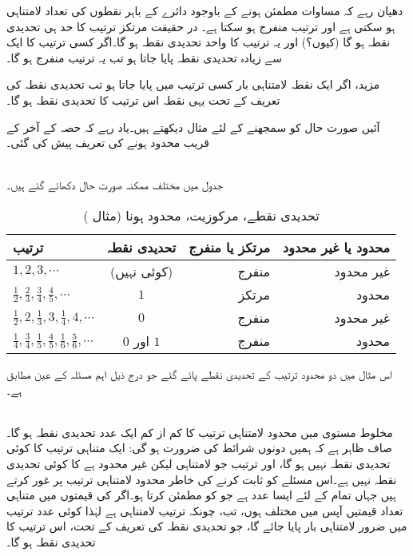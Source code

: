 دھیان رہے کہ مساوات  مطمئن ہونے کے باوجود  دائرے کے باہر نقطوں کی تعداد لامتناہی ہو سکتی ہے اور ترتیب منفرج ہو سکتا ہے۔ در حقیقت مرتکز ترتیب کا حد ہی تحدیدی نقطہ ہو گا (کیوں؟)  اور یہ ترتیب کا واحد تحدیدی نقطہ ہو گا۔اگر کسی ترتیب کا ایک سے زیادہ تحدیدی نقطہ پایا جاتا ہو تب یہ ترتیب منفرج ہو گا۔

مزید، اگر ایک نقطہ لامتناہی بار کسی ترتیب میں پایا جاتا ہو تب تحدیدی نقطہ کی تعریف کے تحت یہی نقطہ اس ترتیب کا تحدیدی نقطہ ہو گا۔

آئیں صورت حال کو سمجھنے کے لئے مثال  دیکھتے ہیں۔یاد رہے کہ حصہ  کے آخر کے قریب محدود ہونے کی تعریف پیش کی گئی۔

\quad {}\\
جدول  میں مختلف ممکنہ  صورت حال دکھائے گئے ہیں۔
\begin{table}
\caption{تحدیدی نقطے، مرکوزیت، محدود ہونا (مثال )}
\label{جدول_مثال_ترتیب_جدول_تحدیدی_نقطہ_وغیرہ}
\centering
\begin{tabular}{l | c | r | r}
\hline
ترتیب& تحدیدی نقطہ& مرتکز یا منفرج& محدود یا غیر محدود\\
\hline
\Tstrut $1,2,3,\cdots$& (کوئی نہیں)&منفرج & غیر محدود\\[0.5ex]
$\frac{1}{2}, \frac{2}{3},\frac{3}{4},\frac{4}{5},\cdots$ & $1$ & مرتکز & محدود\\[0.5ex]
$\frac{1}{2},2,\frac{1}{3},3,\frac{1}{4},4,\cdots$ & $0$ & منفرج& غیر محدود\\[0.5ex]
$\frac{1}{4}, \frac{3}{4}, \frac{1}{5},\frac{4}{5}, \frac{1}{6},\frac{5}{6},\cdots$ & $\,0$ اور $1\,$  & منفرج & محدود\\[0.5ex]
\hline
\end{tabular}
\end{table}
 اس مثال میں دو محدود ترتیب کے تحدیدی نقطے پائے گئے جو درج ذیل اہم مسئلہ کے عین مطابق ہے۔

\quad {}\\
مخلوط مستوی میں محدود لامتناہی ترتیب  کا کم از کم ایک عدد تحدیدی نقطہ ہو گا۔
\quad
صاف ظاہر ہے کہ ہمیں دونوں شرائط کی ضرورت ہو گی: ایک متناہی ترتیب کا کوئی تحدیدی نقطہ نہیں ہو گا، اور ترتیب  جو لامتناہی لیکن غیر محدود ہے کا کوئی تحدیدی نقطہ نہیں ہے۔اس مسئلے کو ثابت کرنے کی خاطر محدود لامتناہی ترتیب  پر غور کرتے ہیں جہاں تمام  کے لئے  ایسا عدد ہے جو  کو مطمئن کرتا ہو۔اگر  کی قیمتوں میں متناہی تعداد قیمتیں آپس میں مختلف ہوں، تب، چونکہ ترتیب لامتناہی ہے لہٰذا کوئی عدد  ترتیب میں ضرور لامتناہی بار پایا جائے گا، جو  تحدیدی نقطہ کی تعریف کے تحت، اس ترتیب کا تحدیدی نقطہ ہو گا۔

